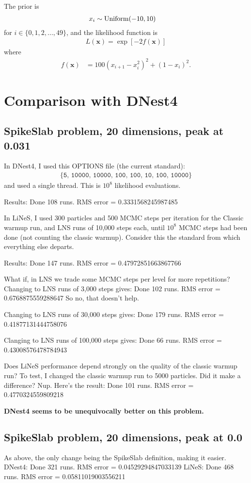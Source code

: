 \documentclass[a4paper, 12pt]{article}
\begin{document}
The prior is
\begin{align}
x_i &\sim \textnormal{Uniform}(-10, 10)
\end{align}
for $i \in \{0, 1, 2, ..., 49\}$,
and the likelihood function is
\begin{align}
L(\boldsymbol{x}) = \exp\left[-2f(\boldsymbol{x})\right]
\end{align}
where
\begin{align}
f(\boldsymbol{x}) &= 100(x_{i+1} - x_{i}^2)^2 + (1-x_i)^2.
\end{align}




\section{Comparison with DNest4}

\subsection{SpikeSlab problem, 20 dimensions, peak at 0.031}
In DNest4, I used this OPTIONS file (the current standard):
\begin{align}
\{\texttt{5, 10000, 10000, 100, 100, 10, 100, 10000}\}
\end{align}
and used
a single thread. This is $10^8$ likelihood evaluations.

Results:
Done 108 runs. RMS error = 0.3331568245987485

In LiNeS, I used 300 particles and 500 MCMC steps per iteration
for the Classic warmup run, and
LNS runs of 10,000 steps each, until $10^8$ MCMC steps
had been done (not counting the classic warmup).
Consider this the standard from which everything else
departs.

Results:
Done 147 runs. RMS error = 0.47972851663867766

What if, in LNS we trade some MCMC steps per level
for more repetitions? Changing to LNS runs of
3,000 steps gives:
Done 102 runs. RMS error = 0.6768875559288647
So no, that doesn't help.

Changing to LNS runs of 30,000 steps gives:
Done 179 runs. RMS error = 0.41877131444758076

Clanging to LNS runs of 100,000 steps gives:
Done 66 runs. RMS error = 0.43008576478784943

Does LiNeS performance depend strongly on the quality of the
classic warmup run? To test, I changed the classic warmup run to 5000
particles. Did it make a difference? Nup. Here's the result:
Done 101 runs. RMS error = 0.4770324559809218

{\bf DNest4 seems to be unequivocally better on this problem.}

\subsection{SpikeSlab problem, 20 dimensions, peak at 0.0}
As above, the only change being the SpikeSlab definition, making it
easier.
DNest4: Done 321 runs. RMS error = 0.04529294847033139
LiNeS: Done 468 runs. RMS error = 0.05811019003556211




\end{document}
